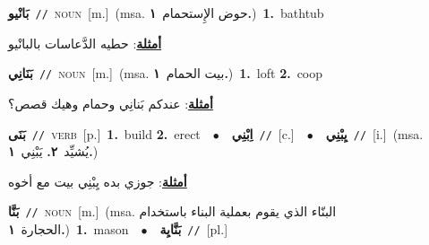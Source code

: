 \documentclass[10pt,a4paper,twoside]{article} %
\begin{document}
\begin{multicols}{2}
{\setlength\topsep{0pt}\textbf{\foreignlanguage{arabic}{بَانْيو}}\ {\color{gray}\texttt{//}\color{black}}\ \textsc{noun}\ [m.]\ \color{gray}(msa. \foreignlanguage{arabic}{حوض الإِستحمام}~\foreignlanguage{arabic}{\textbf{١.}})\color{black}\ \textbf{1.}~bathtub\  \begin{flushright}\color{gray}\foreignlanguage{arabic}{\textbf{\underline{\foreignlanguage{arabic}{أمثلة}}}: حطيه الدَّعاسات بالبانْيو}\end{flushright}\color{black}} \vspace{2mm}

{\setlength\topsep{0pt}\textbf{\foreignlanguage{arabic}{بَنَانِي}}\ {\color{gray}\texttt{//}\color{black}}\ \textsc{noun}\ [m.]\ \color{gray}(msa. \foreignlanguage{arabic}{بيت الحمام}~\foreignlanguage{arabic}{\textbf{١.}})\color{black}\ \textbf{1.}~loft  \textbf{2.}~coop\  \begin{flushright}\color{gray}\foreignlanguage{arabic}{\textbf{\underline{\foreignlanguage{arabic}{أمثلة}}}: عندكم بَنانِي وحمام وهيك قصص؟}\end{flushright}\color{black}} \vspace{2mm}

{\setlength\topsep{0pt}\textbf{\foreignlanguage{arabic}{بَنَى}}\ {\color{gray}\texttt{//}\color{black}}\ \textsc{verb}\ [p.]\ \textbf{1.}~build  \textbf{2.}~erect\ \ $\bullet$\ \ \setlength\topsep{0pt}\textbf{\foreignlanguage{arabic}{اِبْنِي}}\ {\color{gray}\texttt{//}\color{black}}\ [c.]\ \ $\bullet$\ \ \setlength\topsep{0pt}\textbf{\foreignlanguage{arabic}{يِبْنِي}}\ {\color{gray}\texttt{//}\color{black}}\ [i.]\ \color{gray}(msa. \foreignlanguage{arabic}{يُشيِّد}~\foreignlanguage{arabic}{\textbf{٢.}}  \foreignlanguage{arabic}{يَبْنِي}~\foreignlanguage{arabic}{\textbf{١.}})\color{black}\  \begin{flushright}\color{gray}\foreignlanguage{arabic}{\textbf{\underline{\foreignlanguage{arabic}{أمثلة}}}: جوزي بده يِبْنِي بيت مع أخوه}\end{flushright}\color{black}} \vspace{2mm}

{\setlength\topsep{0pt}\textbf{\foreignlanguage{arabic}{بَنَّا}}\ {\color{gray}\texttt{//}\color{black}}\ \textsc{noun}\ [m.]\ \color{gray}(msa. \foreignlanguage{arabic}{البنّاء الذي يقوم بعملية البناء باستخدام الحجارة}~\foreignlanguage{arabic}{\textbf{١.}})\color{black}\ \textbf{1.}~mason\ \ $\bullet$\ \ \setlength\topsep{0pt}\textbf{\foreignlanguage{arabic}{بَنَّايِة}}\ {\color{gray}\texttt{//}\color{black}}\ [pl.]\ } \vspace{2mm}


\end{multicols}
\end{document}
